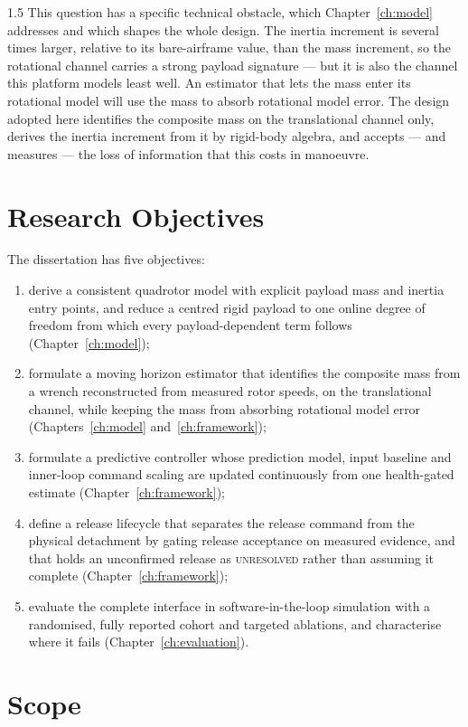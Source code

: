 \begin{spacing}{1.5}
This question has a specific technical obstacle, which
Chapter~\ref{ch:model} addresses and which shapes the whole design. The inertia
increment is several times larger, relative to its bare-airframe value, than the
mass increment, so the rotational channel carries a strong payload signature ---
but it is also the channel this platform models least well. An estimator that
lets the mass enter its rotational model will use the mass to absorb rotational
model error. The design adopted here identifies the composite mass on the
translational channel only, derives the inertia increment from it by rigid-body
algebra, and accepts --- and measures --- the loss of information that this
costs in manoeuvre.

\section{Research Objectives}

The dissertation has five objectives:
\begin{enumerate}
\item derive a consistent quadrotor model with explicit payload mass and inertia
entry points, and reduce a centred rigid payload to one online degree of freedom
from which every payload-dependent term follows (Chapter~\ref{ch:model});
\item formulate a moving horizon estimator that identifies the composite mass
from a wrench reconstructed from measured rotor speeds, on the translational
channel, while keeping the mass from absorbing rotational model error
(Chapters~\ref{ch:model} and~\ref{ch:framework});
\item formulate a predictive controller whose prediction model, input baseline
and inner-loop command scaling are updated continuously from one health-gated
estimate (Chapter~\ref{ch:framework});
\item define a release lifecycle that separates the release command from the
physical detachment by gating release acceptance on measured evidence, and that
holds an unconfirmed release as \textsc{unresolved} rather than assuming it
complete (Chapter~\ref{ch:framework});
\item evaluate the complete interface in software-in-the-loop simulation with a
randomised, fully reported cohort and targeted ablations, and characterise where
it fails (Chapter~\ref{ch:evaluation}).
\end{enumerate}

\section{Scope}


\end{spacing}
